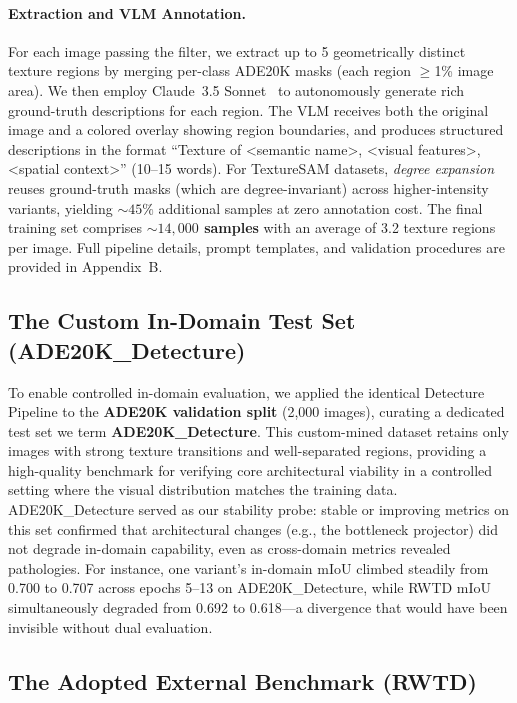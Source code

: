 \documentclass{article}
\begin{document}
\paragraph{Extraction and VLM Annotation.}
For each image passing the filter, we extract up to 5 geometrically distinct texture regions by merging per-class ADE20K masks (each region $\geq$1\% image area). We then employ Claude~3.5 Sonnet~\cite{claude} to autonomously generate rich ground-truth descriptions for each region. The VLM receives both the original image and a colored overlay showing region boundaries, and produces structured descriptions in the format ``Texture of <semantic name>, <visual features>, <spatial context>'' (10--15 words). For TextureSAM datasets, \emph{degree expansion} reuses ground-truth masks (which are degree-invariant) across higher-intensity variants, yielding ${\sim}45\%$ additional samples at zero annotation cost. The final training set comprises \textbf{${\sim}14{,}000$ samples} with an average of 3.2 texture regions per image. Full pipeline details, prompt templates, and validation procedures are provided in Appendix~B.

\subsection{The Custom In-Domain Test Set (ADE20K\_Detecture)}
\label{sec:ade20k_detecture}

To enable controlled in-domain evaluation, we applied the identical Detecture Pipeline to the \textbf{ADE20K validation split} (2,000 images), curating a dedicated test set we term \textbf{ADE20K\_Detecture}. This custom-mined dataset retains only images with strong texture transitions and well-separated regions, providing a high-quality benchmark for verifying core architectural viability in a controlled setting where the visual distribution matches the training data. ADE20K\_Detecture served as our stability probe: stable or improving metrics on this set confirmed that architectural changes (e.g., the bottleneck projector) did not degrade in-domain capability, even as cross-domain metrics revealed pathologies. For instance, one variant's in-domain mIoU climbed steadily from 0.700 to 0.707 across epochs 5--13 on ADE20K\_Detecture, while RWTD mIoU simultaneously degraded from 0.692 to 0.618---a divergence that would have been invisible without dual evaluation.

\subsection{The Adopted External Benchmark (RWTD)}
\label{sec:rwtd}
\end{document}
